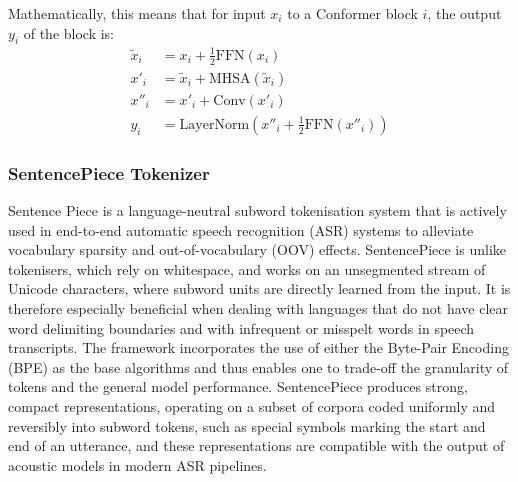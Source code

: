 Mathematically, this means that for input $x_i$ to a Conformer block $i$, the output $y_i$ of the block is:
    \begin{align}
    \tilde{x}_i &= x_i + \frac{1}{2} \text{FFN}(x_i) \\
    x'_i &= \tilde{x}_i + \text{MHSA}(\tilde{x}_i) \\
    x''_i &= x'_i + \text{Conv}(x'_i) \\
    y_i &= \text{LayerNorm}\left(x''_i + \frac{1}{2} \text{FFN}(x''_i)\right)
    \end{align}

\subsubsection{SentencePiece Tokenizer}
Sentence Piece is a language-neutral subword tokenisation system that is actively used in end-to-end automatic speech recognition (ASR) systems to alleviate vocabulary sparsity and out-of-vocabulary (OOV) effects. SentencePiece is unlike tokenisers, which rely on whitespace, and works on an unsegmented stream of Unicode characters, where subword units are directly learned from the input. It is therefore especially beneficial when dealing with languages that do not have clear word delimiting boundaries and with infrequent or misspelt words in speech transcripts. The framework incorporates the use of either the Byte-Pair Encoding (BPE) as the base algorithms and thus enables one to trade-off the granularity of tokens and the general model performance. SentencePiece produces strong, compact representations, operating on a subset of corpora coded uniformly and reversibly into subword tokens, such as special symbols marking the start and end of an utterance, and these representations are compatible with the output of acoustic models in modern ASR pipelines.

